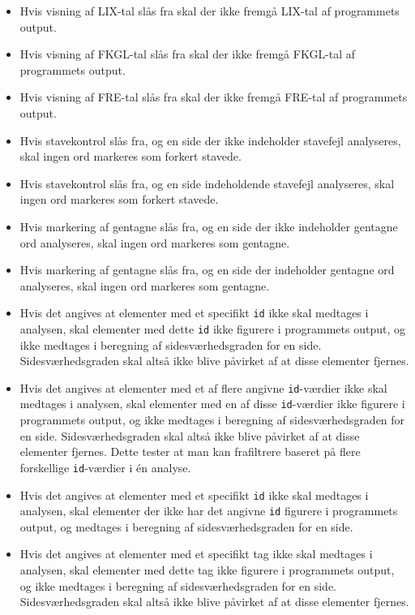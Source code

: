 \documentclass[a4paper,oneside,article]{memoir}
\begin{document}
\begin{itemize}
\item Hvis visning af LIX-tal slås fra skal der ikke fremgå LIX-tal af
  programmets output.
\item Hvis visning af FKGL-tal slås fra skal der ikke fremgå FKGL-tal
  af programmets output.
\item Hvis visning af FRE-tal slås fra skal der ikke fremgå FRE-tal
  af programmets output.
\item Hvis stavekontrol slås fra, og en side der ikke indeholder
  stavefejl analyseres, skal ingen ord markeres som forkert stavede.
\item Hvis stavekontrol slås fra, og en side indeholdende stavefejl
  analyseres, skal ingen ord markeres som forkert stavede.
\item Hvis markering af gentagne slås fra, og en side der ikke
  indeholder gentagne ord analyseres, skal ingen ord markeres som
  gentagne.
\item Hvis markering af gentagne slås fra, og en side der indeholder
  gentagne ord analyseres, skal ingen ord markeres som gentagne.
\item Hvis det angives at elementer med et specifikt \texttt{id} ikke
  skal medtages i analysen, skal elementer med dette \texttt{id} ikke
  figurere i programmets output, og ikke medtages i beregning af
  sidesværhedsgraden for en side. Sidesværhedsgraden skal altså ikke
  blive påvirket af at disse elementer fjernes.
\item Hvis det angives at elementer med et af flere angivne
  \texttt{id}-værdier ikke skal medtages i analysen, skal elementer
  med en af disse \texttt{id}-værdier ikke figurere i programmets
  output, og ikke medtages i beregning af sidesværhedsgraden for en
  side. Sidesværhedsgraden skal altså ikke blive påvirket af at disse
  elementer fjernes. Dette tester at man kan frafiltrere baseret på
  flere forskellige \texttt{id}-værdier i én analyse.
\item Hvis det angives at elementer med et specifikt \texttt{id} ikke
  skal medtages i analysen, skal elementer der ikke har det angivne
  \texttt{id} figurere i programmets output, og medtages i beregning
  af sidesværhedsgraden for en side.
\item Hvis det angives at elementer med et specifikt tag ikke skal
  medtages i analysen, skal elementer med dette tag ikke figurere i
  programmets output, og ikke medtages i beregning af
  sidesværhedsgraden for en side. Sidesværhedsgraden skal altså ikke
  blive påvirket af at disse elementer fjernes.

\end{itemize}
\end{document}

